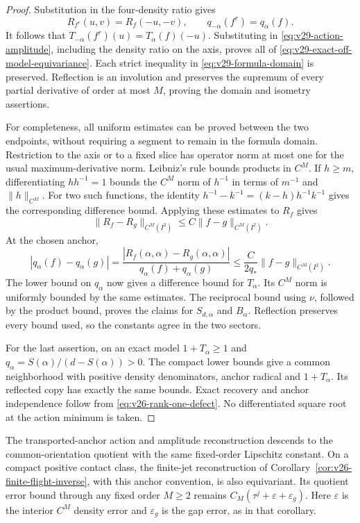 \begin{proof}
Substitution in the four-density ratio gives
\[
 R_{f^r}(u,v)=R_f(-u,-v),\qquad q_{-\alpha}(f^r)=q_\alpha(f).
\]
It follows that \(T_{-\alpha}(f^r)(u)=T_\alpha(f)(-u)\).  Substituting in
\eqref{eq:v29-action-amplitude}, including the density ratio on the axis,
proves all of \eqref{eq:v29-exact-off-model-equivariance}.  Each strict
inequality in \eqref{eq:v29-formula-domain} is preserved.  Reflection is an
involution and preserves the supremum of every partial derivative of order
at most \(M\), proving the domain and isometry assertions.

For completeness, all uniform estimates can be proved between the two
endpoints, without requiring a segment to remain in the formula domain.
Restriction to the axis or to a fixed slice has operator norm at most one
for the usual maximum-derivative norm.  Leibniz's rule bounds products in
\(C^M\).  If \(h\ge m\), differentiating \(h h^{-1}=1\) bounds the
\(C^M\) norm of \(h^{-1}\) in terms of \(m^{-1}\) and \(\|h\|_{C^M}\).
For two such functions, the identity
\(h^{-1}-k^{-1}=(k-h)h^{-1}k^{-1}\) gives the corresponding difference
bound.  Applying these estimates to \(R_f\) gives
\[
 \|R_f-R_g\|_{C^M(I^2)}\le C\|f-g\|_{C^M(I^2)}.
\]
At the chosen anchor,
\[
 |q_\alpha(f)-q_\alpha(g)|
 =\frac{|R_f(\alpha,\alpha)-R_g(\alpha,\alpha)|}
             {q_\alpha(f)+q_\alpha(g)}
 \le \frac{C}{2q_*}\|f-g\|_{C^M(I^2)}.
\]
The lower bound on \(q_\alpha\) now gives a difference bound for \(T_\alpha\).
Its \(C^M\) norm is uniformly bounded by the same estimates.  The reciprocal
bound using \(\nu\), followed by the product bound, proves the claims for
\(S_{d,\alpha}\) and \(B_\alpha\).  Reflection preserves every bound used,
so the constants agree in the two sectors.

For the last assertion, on an exact model \(1+T_\alpha\ge1\) and
\(q_\alpha=S(\alpha)/(d-S(\alpha))>0\).  The compact lower bounds give a
common neighborhood with positive density denominators, anchor radical and
\(1+T_\alpha\).  Its reflected copy has exactly the same bounds.  Exact
recovery and anchor independence follow from
\eqref{eq:v26-rank-one-defect}.  No differentiated square root at the action
minimum is taken.
\end{proof}

\begin{corollary}
\label{cor:v29-density-orbit-stability}
The transported-anchor action and amplitude reconstruction descends to the
common-orientation quotient with the same fixed-order Lipschitz constant.
On a compact positive contact class, the finite-jet reconstruction of
Corollary~\ref{cor:v26-finite-flight-inverse}, with this anchor convention,
is also equivariant.  Its quotient error bound through any fixed order
\(M\ge2\) remains \(C_M(\tau^j+\varepsilon+\varepsilon_g)\).
Here \(\varepsilon\) is the interior \(C^M\) density error and
\(\varepsilon_g\) is the gap error, as in that corollary.
\end{corollary}

